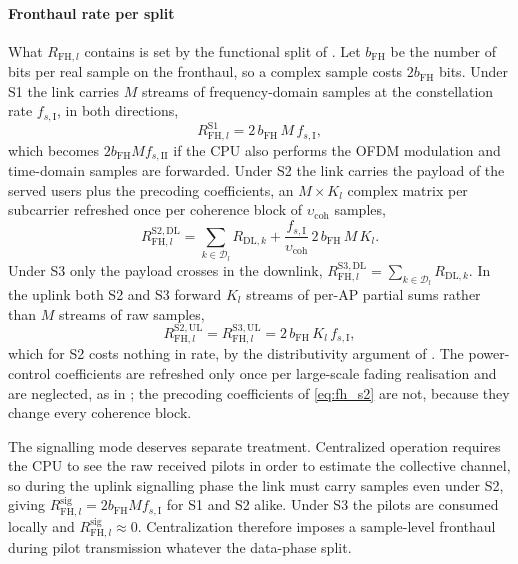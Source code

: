 \paragraph{Fronthaul rate per split}
What $R_{\mathrm{FH},l}$ contains is set by the functional split of
. Let $b_{\mathrm{FH}}$ be the number of bits per real sample
on the fronthaul, so a complex sample costs $2b_{\mathrm{FH}}$ bits. Under S1 the
link carries $M$ streams of frequency-domain samples at the constellation rate
$f_{s,\mathrm{I}}$, in both directions,
\begin{equation}
\label{eq:fh_s1}
R_{\mathrm{FH},l}^{\mathrm{S1}} = 2\,b_{\mathrm{FH}}\,M\,f_{s,\mathrm{I}},
\end{equation}
which becomes $2b_{\mathrm{FH}}Mf_{s,\mathrm{II}}$ if the CPU also performs the
OFDM modulation and time-domain samples are forwarded. Under S2 the link carries
the payload of the served users plus the precoding coefficients, an $M\times
K_{l}$ complex matrix per subcarrier refreshed once per coherence block of
$\upsilon_{\mathrm{coh}}$ samples,
\begin{equation}
\label{eq:fh_s2}
R_{\mathrm{FH},l}^{\mathrm{S2,DL}} = \sum_{k\in\mathcal{D}_{l}} R_{\mathrm{DL},k}
+ \frac{f_{s,\mathrm{I}}}{\upsilon_{\mathrm{coh}}}\,2\,b_{\mathrm{FH}}\,M\,K_{l}.
\end{equation}
Under S3 only the payload crosses in the downlink,
$R_{\mathrm{FH},l}^{\mathrm{S3,DL}}=\sum_{k\in\mathcal{D}_{l}}R_{\mathrm{DL},k}$.
In the uplink both S2 and S3 forward $K_{l}$ streams of per-AP partial sums
rather than $M$ streams of raw samples,
\begin{equation}
\label{eq:fh_ul}
R_{\mathrm{FH},l}^{\mathrm{S2,UL}} = R_{\mathrm{FH},l}^{\mathrm{S3,UL}}
= 2\,b_{\mathrm{FH}}\,K_{l}\,f_{s,\mathrm{I}},
\end{equation}
which for S2 costs nothing in rate, by the distributivity argument of
. The power-control coefficients are refreshed only once per
large-scale fading realisation and are neglected, as in \cite{ngo2018total}; the
precoding coefficients of \eqref{eq:fh_s2} are not, because they change every
coherence block.

The signalling mode deserves separate treatment. Centralized operation requires
the CPU to see the raw received pilots in order to estimate the collective
channel, so during the uplink signalling phase the link must carry samples even
under S2, giving $R^{\mathrm{sig}}_{\mathrm{FH},l}=2b_{\mathrm{FH}}M
f_{s,\mathrm{I}}$ for S1 and S2 alike. Under S3 the pilots are consumed locally
and $R^{\mathrm{sig}}_{\mathrm{FH},l}\approx 0$. Centralization therefore imposes
a sample-level fronthaul during pilot transmission whatever the data-phase split.

